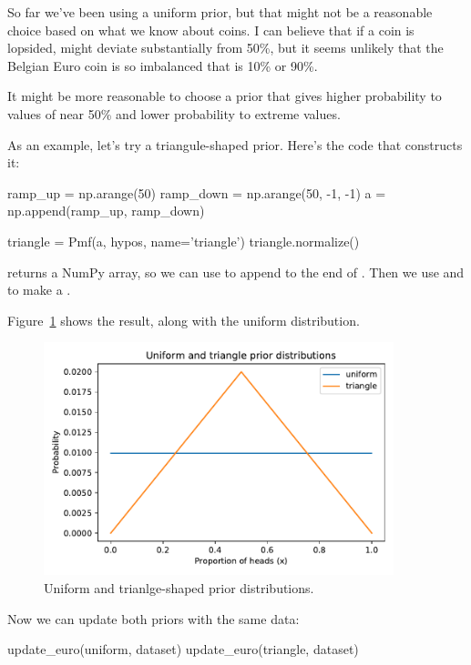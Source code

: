 \documentclass[12pt]{book}
\theoremstyle{exercise}
\begin{document}
So far we've been using a uniform prior, but that might not be a reasonable choice based on what we know about coins.  
I can believe that if a coin is lopsided,  might deviate substantially from 50\%, but it seems unlikely that the Belgian Euro coin is so imbalanced that  is 10\% or 90\%.

It might be more reasonable to choose a prior that gives
higher probability to values of  near 50\% and lower probability
to extreme values.


As an example, let's try a triangule-shaped prior.
Here's the code that constructs it:

\begin{code}
ramp_up = np.arange(50)
ramp_down = np.arange(50, -1, -1)
a = np.append(ramp_up, ramp_down)

triangle = Pmf(a, hypos, name='triangle')
triangle.normalize()
\end{code}

 returns a NumPy array, so we can use  to append  to the end of .
Then we use  and  to make a .

Figure~\ref{fig03-03} shows the result, along with the uniform distribution.
 
\begin{figure}
\centerline{\includegraphics[width=4in]{figs/fig03-03.pdf}}
\caption{Uniform and trianlge-shaped prior distributions.}
\label{fig03-03}
\end{figure}

Now we can update both priors with the same data: 
 
\begin{code}
update_euro(uniform, dataset)
update_euro(triangle, dataset)
\end{code}
\end{document}
